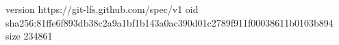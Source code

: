 version https://git-lfs.github.com/spec/v1
oid sha256:81ffe6f893db38c2a9a1bf1b143a0ac390d01c2789f911f00038611b0103b894
size 234861
